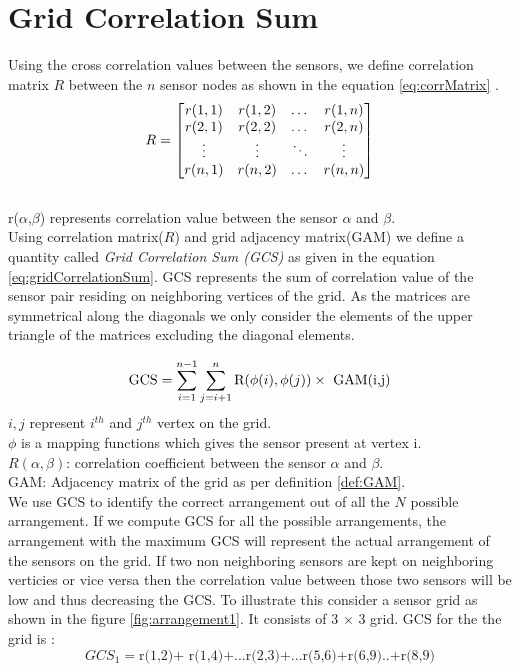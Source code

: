 \section{Grid Correlation Sum}
\label{sec:gcs}
Using the cross correlation values between the sensors, we define correlation matrix $R$ between the $n$ sensor nodes as shown in the equation \ref{eq:corrMatrix} .
\begin{equation}
\label{eq:corrMatrix}
\centering
R = 
\begin{bmatrix}
    r(1,1) & r(1,2) & \dots  & r(1,n) \\
    r(2,1) & r(2,2)  & \dots  & r(2,n) \\
    \vdots & \vdots  & \ddots & \vdots \\
    r(n,1) & r(n,2)  & \dots  & r(n,n)
\end{bmatrix}
\end{equation}\\
r($\alpha$,$\beta$) represents correlation value between the sensor $\alpha$ and $\beta$.\\

Using correlation matrix($R$) and grid adjacency matrix(GAM) we define a quantity called \textit{Grid Correlation Sum (GCS)} as given in the equation \ref{eq:gridCorrelationSum}. GCS represents the sum of correlation value of the sensor pair residing on neighboring vertices of the grid.
As the matrices are symmetrical along the diagonals we only consider the elements of the upper triangle of the matrices excluding the diagonal elements. 

\begin{equation}
\centering
\text{GCS}=\sum_{i=1}^{n-1}\sum_{j=i+1}^{n}\text{R}(\phi(i),\phi(j))  \times \text{ GAM(i,j)}
\label{eq:gridCorrelationSum}
\end{equation}
$i,j$ represent $ i^{th}$ and $ j^{th}$ vertex on the grid.\\
$\phi$ is a mapping functions which gives the sensor present at vertex i.\\
$R(\alpha,\beta)$: correlation coefficient between the sensor $\alpha$ and $\beta$.\\
GAM:  Adjacency matrix of the grid as per definition \ref{def:GAM}.\\

We use GCS to identify the correct arrangement out of all the $N$ possible arrangement. If we compute  GCS for all the possible arrangements, the arrangement with the maximum GCS will represent the actual arrangement of the sensors on the grid.  
If two non neighboring sensors are kept on neighboring verticies or vice versa then the correlation value between those two sensors will be low and thus decreasing the GCS.
To illustrate this consider a sensor grid as shown in the figure \ref{fig:arrangement1}.
 It consists of 3 $\times$ 3 grid.  
GCS for the  the grid is :\\
\begin{equation*}
GCS_{1}=\text{r(1,2)+ r(1,4)+...r(2,3)+...r(5,6)+r(6,9)..+r(8,9)}
\end{equation*}

